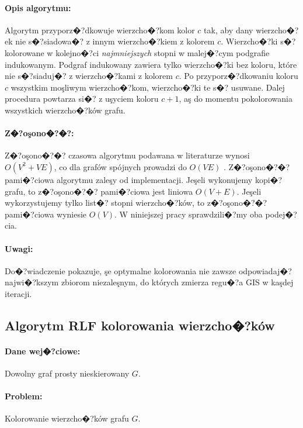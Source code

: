 \documentclass[12pt,a4paper]{mwrep}
\begin{document}
\paragraph{Opis algorytmu:} Algorytm przyporz�?dkowuje wierzcho�?kom
kolor $c$ tak, aby dany wierzcho�?ek nie s�?siadowa�? z innym wierzcho�?kiem
z kolorem $c$. Wierzcho�?ki s�? kolorowane w kolejno�?ci 
\emph{najmniejszych} stopni w malej�?cym podgrafie indukowanym. 
Podgraf indukowany zawiera tylko wierzcho�?ki bez koloru, 
które nie s�?siaduj�? z wierzcho�?kami z kolorem $c$.
Po przyporz�?dkowaniu koloru $c$ wszystkim moşliwym wierzcho�?kom, 
wierzcho�?ki te s�? usuwane.
Dalej procedura powtarza si�? z uşyciem koloru $c+1$, aş do momentu 
pokolorowania wszystkich wierzcho�?ków grafu.

\paragraph{Z�?oşono�?�?:} Z�?oşono�?�? czasowa algorytmu podawana w literaturze
wynosi $O(V^2 + VE)$, co dla grafów spójnych prowadzi do $O(VE)$
\cite{Wojciechowski}.
Z�?oşono�?�? pami�?ciowa algorytmu zaleşy od implementacji.
Jeşeli wykonujemy kopi�? grafu, to z�?oşono�?�? pami�?ciowa
jest liniowa $O(V+E)$.
Jeşeli wykorzystujemy tylko list�? stopni wierzcho�?ków, 
to z�?oşono�?�? pami�?ciowa wyniesie $O(V)$.
W niniejszej pracy sprawdzili�?my oba podej�?cia.

\paragraph{Uwagi:} Do�?wiadczenie pokazuje, şe optymalne kolorowania
nie zawsze odpowiadaj�? najwi�?kszym zbiorom niezaleşnym,
do których zmierza regu�?a GIS w kaşdej iteracji.




\subsection{Algorytm RLF kolorowania wierzcho�?ków}
\label{sec:algorytm_RLF}

\paragraph{Dane wej�?ciowe:} Dowolny graf prosty nieskierowany $G$.

\paragraph{Problem:} Kolorowanie wierzcho�?ków grafu $G$.
\end{document}
